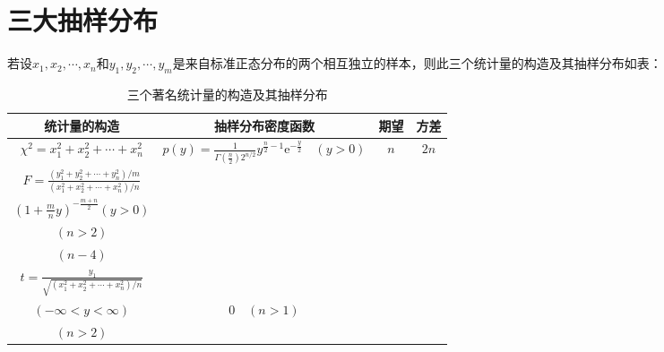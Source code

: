     \section{三大抽样分布}
    若设$x_1,x_2,\cdots,x_n$和$y_1,y_2,\cdots,y_m$是来自标准正态分布的两个相互独立的样本，则此三个统计量的构造及其抽样分布如表：
    \begin{table}[H]
        \centering
        \caption {三个著名统计量的构造及其抽样分布}
        \label{tab:chap:table_1}
        \begin{tabular}{cccc}
            \toprule
            统计量的构造                                                                & 抽样分布密度函数                                                                                                         & 期望  & 方差   \\
            \midrule
            $\chi^2=x_1^2+x_2^2+\cdots+x_n^2$                                     & $p(y)=\frac{1}{\Gamma\left(\frac{n}{2}\right) 2^{n / 2}} y^{\frac{n}{2}-1} \mathrm{e}^{-\frac{y}{2}} \quad(y>0)$ & $n$ & $2n$ \\
            $F=\frac{(y_1^2+y_2^2+\cdots+y_n^2)/m}{(x_1^2+x_2^2+\cdots+x_n^2)/n}$ &
            \makecell[c]{$p(y)=\frac{\Gamma\left(\frac{m+n}{2}\right)\left(\frac{m}{n}\right)^{m / 2}}{\Gamma\left(\frac{m}{2}\right) \Gamma\left(\frac{n}{2}\right)} y^{\frac{m}{2}-1} \cdot $                   \\$\left(1+\frac{m}{n} y\right)^{-\frac{m+n}{2}}(y>0)$} & \makecell[c]{ $\frac{n}{n-2}$                                 \\$(n>2)$} &\makecell[c]{ $\frac{2n^2(m+n-2)}{m(n-2)^2}$\\$(n-4)$} \\
            $t=\frac{y_1}{\sqrt{(x_1^2+x_2^2+\cdots+x_n^2)/n}}$                   &
            \makecell[c]{ $p(y)=\frac{\Gamma\left(\frac{n+1}{2}\right)}{\sqrt{n \pi} \Gamma\left(\frac{n}{2}\right)}\left(1+\frac{y^{2}}{n}\right)^{-\frac{n+1}{2}}$                                              \\$(-\infty<y<\infty)$}       & $0 \quad (n>1)$               & \makecell[c] {$\frac{n}{n-2}$ \\$(n>2)$}          \\
            \bottomrule
        \end{tabular}
    \end{table}

